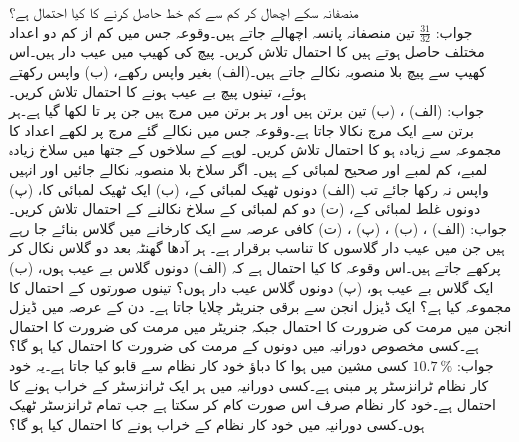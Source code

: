 \quad
{} منصفانہ سکے اچھال کر کم سے کم  خط حاصل کرنے کا کیا احتمال ہے؟\\
جواب:\quad
$\tfrac{31}{32}$
\quad
تین منصفانہ پانسہ اچھالے جاتے ہیں۔وقوعہ  جس میں کم از کم دو اعداد مختلف حاصل ہوتے ہیں کا احتمال تلاش کریں۔
\quad
{} پیچ کی کھیپ میں  عیب دار ہیں۔اس کھیپ سے  پیچ بلا منصوبہ نکالے جاتے ہیں۔(الف) بغیر واپس رکھے، (ب) واپس رکھتے ہوئے، تینوں پیچ بے عیب ہونے کا احتمال تلاش کریں۔\\
جواب:\quad
(الف) ، (ب) 
\quad
تین برتن ہیں اور ہر برتن میں  مرچ ہیں جن پر  تا  لکھا گیا ہے۔ہر برتن سے ایک مرچ نکالا جاتا ہے۔وقوعہ  جس میں نکالے گئے مرچ پر لکھے اعداد کا مجموعہ  سے زیادہ ہو کا احتمال تلاش کریں۔  
\quad
{} لوہے کے سلاخوں کے جتھا میں  سلاخ زیادہ لمبے،  کم لمبے اور  صحیح لمبائی کے ہیں۔ اگر  سلاخ بلا منصوبہ نکالے جائیں اور انہیں واپس نہ رکھا جائے تب (الف) دونوں ٹھیک لمبائی کے، (ب) ایک ٹھیک لمبائی کا، (پ) دونوں غلط لمبائی کے، (ت) دو کم لمبائی کے سلاخ  نکالنے  کے  احتمال تلاش کریں۔\\
جواب:\quad
(الف) ، (ب) ، (پ) ، (ت) 
\quad
کافی عرصہ سے ایک کارخانے میں گلاس بنائے جا رہے ہیں جن میں عیب دار گلاسوں کا تناسب برقرار  ہے۔ ہر آدھا گھنٹہ بعد دو گلاس نکال کر پرکھے جاتے ہیں۔اس وقوعہ کا کیا احتمال ہے کہ  (الف) دونوں گلاس بے عیب ہوں، (ب) ایک گلاس بے عیب ہو، (پ) دونوں گلاس عیب دار ہوں؟ تینوں صورتوں کے احتمال کا مجموعہ کیا ہے؟ 
\quad
ایک ڈیزل انجن سے برقی جنریٹر  چلایا جاتا ہے۔ دن کے عرصہ میں ڈیزل انجن میں مرمت کی ضرورت کا احتمال  جبکہ جنریٹر میں مرمت کی ضرورت کا احتمال  ہے۔کسی مخصوص دورانیہ میں دونوں کے مرمت کی ضرورت کا احتمال کیا ہو گا؟\\
 جواب:\quad
$\SI{10.7}{\percent}$
\quad
کسی مشین میں ہوا کا دباؤ خود کار نظام سے قابو کیا جاتا ہے۔یہ خود کار نظام  ٹرانزسٹر پر مبنی ہے۔کسی دورانیہ میں ہر ایک ٹرانزسٹر کے خراب ہونے کا احتمال  ہے۔خود کار نظام صرف اس صورت کام کر سکتا ہے جب تمام ٹرانزسٹر ٹھیک ہوں۔کسی دورانیہ میں خود کار نظام کے خراب ہونے کا احتمال کیا ہو گا؟  
